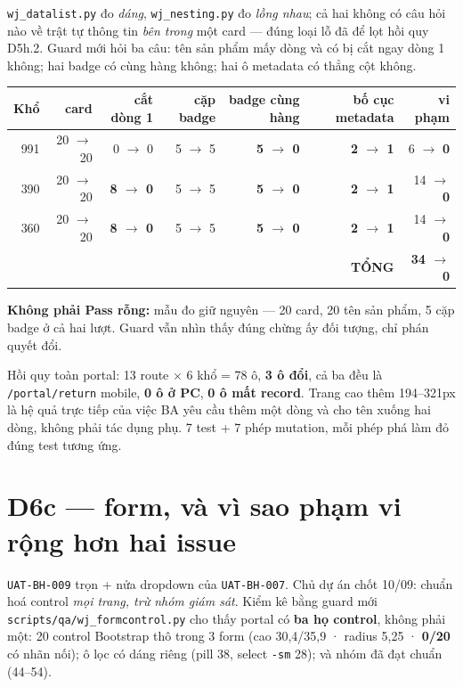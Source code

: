 \texttt{wj\_datalist.py} đo \emph{dáng}, \texttt{wj\_nesting.py} đo \emph{lồng nhau}; cả hai không
có câu hỏi nào về trật tự thông tin \emph{bên trong} một card --- đúng loại lỗ đã để lọt hồi quy
D5h.2. Guard mới hỏi ba câu: tên sản phẩm mấy dòng và có bị cắt ngay dòng 1 không; hai badge có
cùng hàng không; hai ô metadata có thẳng cột không.

\begin{center}
\begin{tabular}{rrrrrrr}
\hline
Khổ & card & cắt dòng 1 & cặp badge & badge cùng hàng & bố cục metadata & vi phạm \\
\hline
991 & 20 $\to$ 20 & 0 $\to$ 0 & 5 $\to$ 5 & \textbf{5 $\to$ 0} & \textbf{2 $\to$ 1} & 6 $\to$ \textbf{0} \\
390 & 20 $\to$ 20 & \textbf{8 $\to$ 0} & 5 $\to$ 5 & \textbf{5 $\to$ 0} & \textbf{2 $\to$ 1} & 14 $\to$ \textbf{0} \\
360 & 20 $\to$ 20 & \textbf{8 $\to$ 0} & 5 $\to$ 5 & \textbf{5 $\to$ 0} & \textbf{2 $\to$ 1} & 14 $\to$ \textbf{0} \\
\hline
\multicolumn{6}{r}{\textbf{TỔNG}} & \textbf{34 $\to$ 0} \\
\hline
\end{tabular}
\end{center}

\textbf{Không phải Pass rỗng:} mẫu đo giữ nguyên --- 20 card, 20 tên sản phẩm, 5 cặp badge ở cả hai
lượt. Guard vẫn nhìn thấy đúng chừng ấy đối tượng, chỉ phán quyết đổi.

Hồi quy toàn portal: 13 route $\times$ 6 khổ = 78 ô, \textbf{3 ô đổi}, cả ba đều là
\texttt{/portal/return} mobile, \textbf{0 ô ở PC}, \textbf{0 ô mất record}. Trang cao thêm
194--321px là hệ quả trực tiếp của việc BA yêu cầu thêm một dòng và cho tên xuống hai dòng, không
phải tác dụng phụ. 7 test + 7 phép mutation, mỗi phép phá làm đỏ đúng test tương ứng.

\section{D6c --- form, và vì sao phạm vi rộng hơn hai issue}

\texttt{UAT-BH-009} trọn + nửa dropdown của \texttt{UAT-BH-007}. Chủ dự án chốt 10/09: chuẩn hoá
control \emph{mọi trang, trừ nhóm giám sát}. Kiểm kê bằng guard mới
\texttt{scripts/qa/wj\_formcontrol.py} cho thấy portal có \textbf{ba họ control}, không phải một:
20 control Bootstrap thô trong 3 form (cao 30,4/35,9 · radius 5,25 · \textbf{0/20} có nhãn nối);
ô lọc có dáng riêng (pill 38, select \texttt{-sm} 28); và nhóm đã đạt chuẩn (44--54).

